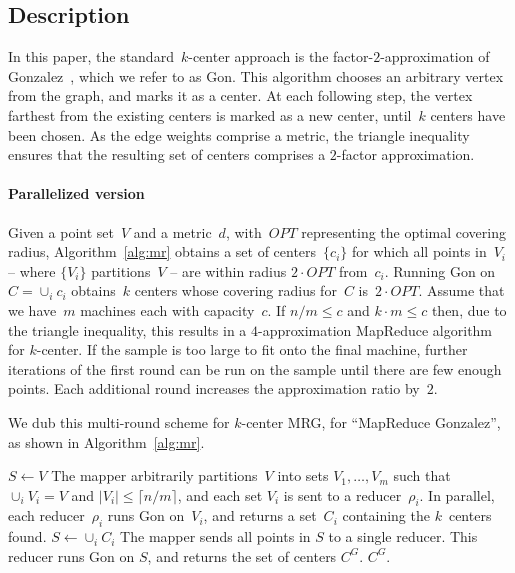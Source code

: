 \documentclass[11pt]{article}
\newcommand{\ours}{{\sc MRG}\xspace}
\newcommand{\gon}{{\sc Gon}\xspace}
\newcommand{\OPT}{\ensuremath{\mathit{OPT}}}
\begin{document}
\subsection{Description}

In this paper, the standard~$k$-center approach is the factor-$2$-approximation
of Gonzalez~\cite{gonzalez1985clustering}, which we refer to as \gon.
This algorithm chooses an arbitrary vertex from the graph, and marks it as a center.
At each following step, the vertex farthest from the existing centers is marked as a new center,
until~$k$ centers have been chosen.
As the edge weights comprise a metric, the triangle inequality ensures that the resulting set of centers comprises a $2$-factor approximation. 


\paragraph*{Parallelized version}
Given a point set~$V$ and a metric~$d$, with~$\OPT$ representing the optimal
covering radius,
Algorithm~\ref{alg:mr} obtains a set of centers~$\{c_i\}$
for which all points
in~$V_i$ -- where $\{V_i\}$ partitions~$V$ -- are within radius $2\cdot \OPT$ from~$c_i$. 
Running \gon on $C= \cup_i c_i$ obtains~$k$ centers whose
covering radius for~$C$ is~$2 \cdot \OPT$.
Assume that we have~$m$ machines each with capacity~$c$.
If $n/m \leq c$ and $k\cdot m\leq c$ then,
due to the triangle inequality, this results in a $4$-approximation MapReduce algorithm for $k$-center.
If the sample is too large to fit onto the final machine, further iterations of the first round can be run on the sample until there are few enough points.
Each additional round increases the approximation ratio by~$2$.

We dub this multi-round scheme
for $k$-center \ours, for ``MapReduce Gonzalez'', as shown in 
Algorithm~\ref{alg:mr}.

\begin{algorithm}\begin{algorithmic}[1]
\small
\STATE $S \gets V$
\STATE The mapper arbitrarily partitions~$V$ into sets $V_1, \ldots, V_m$ such that $\cup_i V_i = V$ and $|V_i| \leq \lceil n/m \rceil $, and each set $V_i$ is sent to a reducer~$\rho_i$. 
\STATE In parallel, each reducer~$\rho_i$ runs \gon on~$V_i$, and returns a set~$C_i$ containing the $k$~centers found.
\STATE $S \gets \cup_i C_i$
\ENDWHILE
\STATE The mapper sends all points in $S$ to a single reducer.
\STATE This reducer runs \gon on $S$, and returns the set of centers $C^G$.
\RETURN $C^G$.
\end{algorithmic}
\caption{$\texttt{\ours}(V,k,m)$}
\label{alg:mr}
\end{algorithm}
\end{document}
